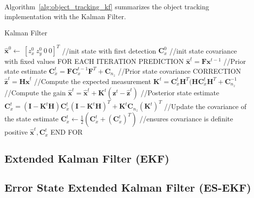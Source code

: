 Algorithm~\ref{alg:object_tracking_kf} summarizes the object tracking implementation with the Kalman Filter.
\begin{algorithm}
\caption{Kalman Filter}
\begin{algorithmic}
\STATE $\hat{\mathbf{x}}^0 \leftarrow\ [z^0_x\ z^0_y\ 0\ 0]^T$ //init state with first detection
\STATE$\mathbf{C}^0_x$ //init state covariance with fixed values 
\STATE FOR EACH ITERATION
\STATE \hspace{0.5cm} PREDICTION
\STATE \hspace{1cm} $\hat{\mathbf{x}}^{\underline{t}} = \mathbf{F}\mathbf{x}^{t-1}$ //Prior state estimate
\STATE \hspace{1cm} $\mathbf{C}^{\underline{t}}_x = \mathbf{F}\mathbf{C}^{t-1}_x\mathbf{F}^T + \mathbf{C}_{n_z}$ //Prior state covariance
\STATE \hspace{0.5cm} CORRECTION
\STATE \hspace{1cm} $\hat{\mathbf{z}}^t = \mathbf{H}\hat{\mathbf{x}}^{\underline{t}}$ //Compute the expected measurement 
\STATE \hspace{1cm} $\mathbf{K}^t = \mathbf{C}^{\underline{t}}_x\mathbf{H}^T(\mathbf{H}\mathbf{C}^{\underline{t}}_x\mathbf{H}^T+\mathbf{C}_{n_z}^{-1}$ 
//Compute the gain
\STATE \hspace{1cm} $\hat{\mathbf{x}}^t = \hat{\mathbf{x}}^{\underline{t}} + \mathbf{K}^t(\mathbf{z}^t - \hat{\mathbf{z}}^t)$ //Posterior state estimate
\STATE \hspace{1cm} $\mathbf{C}^t_{x} = (\mathbf{I}-\mathbf{K}^t\mathbf{H})\mathbf{C}^{\underline{t}}_x(\mathbf{I}-\mathbf{K}^t\mathbf{H})^T
		    + \mathbf{K}^t\mathbf{C}_{n_z}(\mathbf{K}^t)^T$ //Update the covariance of the state estimate
\STATE \hspace{1cm} $\mathbf{C}^t_{x} \leftarrow \frac{1}{2}(\mathbf{C}^t_{x}+(\mathbf{C}^t_{x})^T)$ //ensures covariance is definite positive
\RETURN $\hat{\mathbf{x}}^t,\mathbf{C}^t_x$		    
\STATE END FOR
\end{algorithmic}
\label{alg:object_tracking_kf}
\end{algorithm}


\subsection{Extended Kalman Filter (EKF)}

\subsection{Error State Extended Kalman Filter (ES-EKF)}
